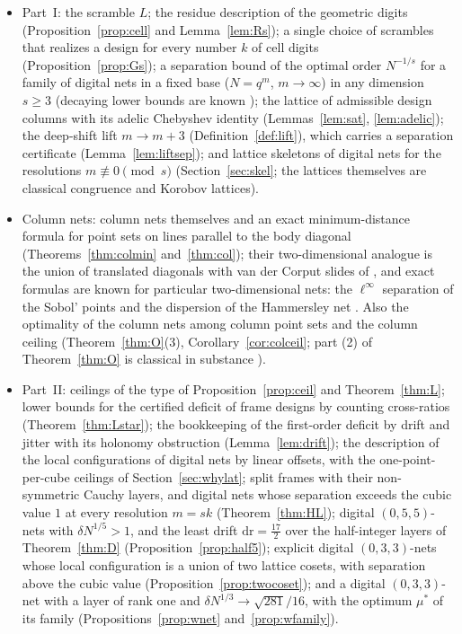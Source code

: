 \documentclass[11pt]{amsart}
\theoremstyle{definition}
\theoremstyle{plain}
\begin{document}
\begin{itemize}
\item Part~I: the scramble $L$; the residue description of the geometric digits (Proposition~\ref{prop:cell} and Lemma~\ref{lem:Rs}); a single choice of scrambles that realizes a design for every number $k$ of cell digits (Proposition~\ref{prop:Gs}); a separation bound of the optimal order $N^{-1/s}$ for a family of digital nets in a fixed base ($N=q^m$, $m\to\infty$) in any dimension $s\ge3$ (decaying lower bounds are known \cite{SS07}); the lattice of admissible design columns with its adelic Chebyshev identity (Lemmas~\ref{lem:sat}, \ref{lem:adelic}); the deep-shift lift $m\to m+3$ (Definition~\ref{def:lift}), which carries a separation certificate (Lemma~\ref{lem:liftsep}); and lattice skeletons of digital nets for the resolutions $m\not\equiv0\pmod s$ (Section~\ref{sec:skel}; the lattices themselves are classical congruence and Korobov lattices).
\item Column nets: column nets themselves and an exact minimum-distance formula for point sets on lines parallel to the body diagonal (Theorems~\ref{thm:colmin} and~\ref{thm:col}); their two-dimensional analogue is the union of translated diagonals with van der Corput slides of \cite[Sec.~3]{GK09}, and exact formulas are known for particular two-dimensional nets: the $\ell^\infty$ separation of the Sobol' points \cite{Suz25} and the dispersion of the Hammersley net \cite{Kri21}. Also the optimality of the column nets among column point sets and the column ceiling (Theorem~\ref{thm:O}(3), Corollary~\ref{cor:colceil}; part (2) of Theorem~\ref{thm:O} is classical in substance \cite{Pai51,HP55}).
\item Part~II: ceilings of the type of Proposition~\ref{prop:ceil} and Theorem~\ref{thm:L}; lower bounds for the certified deficit of frame designs by counting cross-ratios (Theorem~\ref{thm:Lstar}); the bookkeeping of the first-order deficit by drift and jitter with its holonomy obstruction (Lemma~\ref{lem:drift}); the description of the local configurations of digital nets by linear offsets, with the one-point-per-cube ceilings of Section~\ref{sec:whylat}; split frames with their non-symmetric Cauchy layers, and digital nets whose separation exceeds the cubic value $1$ at every resolution $m=sk$ (Theorem~\ref{thm:HL}); digital $(0,5,5)$-nets with $\delta N^{1/5}>1$, and the least drift $\mathrm{dr}=\frac{17}2$ over the half-integer layers of Theorem~\ref{thm:D} (Proposition~\ref{prop:half5}); explicit digital $(0,3,3)$-nets whose local configuration is a union of two lattice cosets, with separation above the cubic value (Proposition~\ref{prop:twocoset}); and a digital $(0,3,3)$-net with a layer of rank one and $\delta N^{1/3}\to\sqrt{281}/16$, with the optimum $\mu^*$ of its family (Propositions~\ref{prop:wnet} and~\ref{prop:wfamily}).
\end{itemize}
\end{document}
